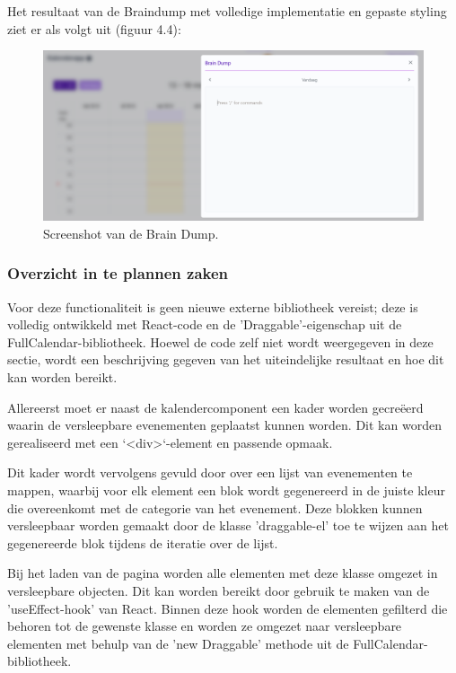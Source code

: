 Het resultaat van de Braindump met volledige implementatie en gepaste styling ziet er als volgt uit (figuur 4.4):

\begin{figure}[h]
    \centering
    \includegraphics[width=\textwidth]{graphics/screenshot_braindump.png}
    \caption{Screenshot van de Brain Dump.}
    \label{fig:screenshot_braindump}
\end{figure}

\subsubsection{Overzicht in te plannen zaken}

Voor deze functionaliteit is geen nieuwe externe bibliotheek vereist; deze is volledig ontwikkeld met React-code en de 'Draggable'-eigenschap uit de FullCalendar-bibliotheek. Hoewel de code zelf niet wordt weergegeven in deze sectie, wordt een beschrijving gegeven van het uiteindelijke resultaat en hoe dit kan worden bereikt. \newline

Allereerst moet er naast de kalendercomponent een kader worden gecreëerd waarin de versleepbare evenementen geplaatst kunnen worden. Dit kan worden gerealiseerd met een `<div>`-element en passende opmaak. \newline

Dit kader wordt vervolgens gevuld door over een lijst van evenementen te mappen, waarbij voor elk element een blok wordt gegenereerd in de juiste kleur die overeenkomt met de categorie van het evenement. Deze blokken kunnen versleepbaar worden gemaakt door de klasse 'draggable-el' toe te wijzen aan het gegenereerde blok tijdens de iteratie over de lijst. \newline

Bij het laden van de pagina worden alle elementen met deze klasse omgezet in versleepbare objecten. Dit kan worden bereikt door gebruik te maken van de 'useEffect-hook' van React. Binnen deze hook worden de elementen gefilterd die behoren tot de gewenste klasse en worden ze omgezet naar versleepbare elementen met behulp van de 'new Draggable' methode uit de FullCalendar-bibliotheek. \newline

